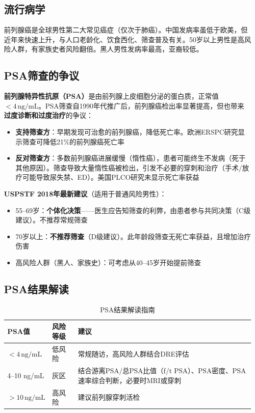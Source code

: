 \subsection{流行病学}

前列腺癌是全球男性第二大常见癌症（仅次于肺癌）。中国发病率虽低于欧美，但近年来快速上升，与人口老龄化、饮食西化、筛查普及有关。50岁以上男性是高风险人群，有家族史者风险翻倍。黑人男性发病率最高，亚裔较低。

\subsection{PSA筛查的争议}

\textbf{前列腺特异性抗原（PSA）}是由前列腺上皮细胞分泌的蛋白质，正常值$<4\,\mathrm{ng/mL}$。PSA筛查自1990年代推广后，前列腺癌检出率显著提高，但也带来\textbf{过度诊断和过度治疗}的争议：

\begin{itemize}[leftmargin=2cm]
	\item \textbf{支持筛查方}：早期发现可治愈的前列腺癌，降低死亡率。欧洲ERSPC研究显示筛查可降低21\%的前列腺癌死亡率
	\item \textbf{反对筛查方}：多数前列腺癌进展缓慢（惰性癌），患者可能终生不发病（死于其他原因）。筛查导致大量惰性癌被检出，引发不必要的穿刺和治疗（手术/放疗可能导致尿失禁、ED）。美国PLCO研究未显示死亡率获益
\end{itemize}

\textbf{USPSTF 2018年最新建议}（适用于普通风险男性）：
\begin{itemize}[leftmargin=2cm]
	\item 55--69岁：\textbf{个体化决策}——医生应告知筛查的利弊，由患者参与共同决策（C级建议）。不推荐常规筛查
	\item 70岁以上：\textbf{不推荐筛查}（D级建议）。此年龄段筛查无死亡率获益，且增加治疗伤害
	\item 高风险人群（黑人、家族史）：可考虑从40--45岁开始提前筛查
\end{itemize}

\subsection{PSA结果解读}

\begin{table}[htbp]
\centering
\caption{PSA结果解读指南}
\label{tab:psa_interpretation}
\begin{tabularx}{\textwidth}{@{}llX@{}}
    \toprule
    \textbf{PSA值} & \textbf{风险等级} & \textbf{建议} \\
    \midrule
    $<4\,\mathrm{ng/mL}$ & 低风险 & 常规随访，高风险人群结合DRE评估 \\
    4--10 ng/mL & 灰区 & 结合游离PSA/总PSA比值（f/t PSA）、PSA密度、PSA速率综合判断，必要时MRI或穿刺 \\
    $>10\,\mathrm{ng/mL}$ & 高风险 & 建议前列腺穿刺活检 \\
    \bottomrule
\end{tabularx}
\end{table}

